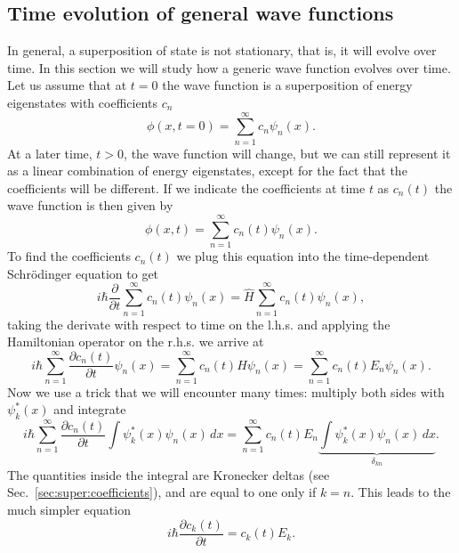 \documentclass[../Main/chem331-notes.tex]{subfiles}
\begin{document}
\subsection{Time evolution of general wave functions}
In general, a superposition of state is not stationary, that is, it will evolve over time.
In this section we will study how a generic wave function evolves over time.
Let us assume that at $t = 0$ the wave function is a superposition of energy eigenstates with coefficients $c_n$
\begin{equation}
\phi(x, t = 0) = \sum_{n = 1}^\infty c_n \psi_n(x).
\end{equation}
At a later time, $t > 0$, the wave function will change, but we can still represent it as a linear combination of energy eigenstates, except for the fact that the coefficients will be different. If we indicate the coefficients at time $t$ as $c_n(t)$ the wave function is then given by
\begin{equation}
\label{eq:super:tdwavefunction}
\phi(x, t) = \sum_{n = 1}^\infty c_n(t) \psi_n(x).
\end{equation}
To find the coefficients $c_n(t)$ we plug this equation into the time-dependent Schr\"{o}dinger equation to get
\begin{equation}
i\hbar \frac{\partial }{\partial t} \sum_{n = 1}^\infty c_n(t) \psi_n(x)= \hat{H} \sum_{n = 1}^\infty c_n(t) \psi_n(x),
\end{equation}
taking the derivate with respect to time on the l.h.s. and applying the Hamiltonian operator on the r.h.s. we arrive at
\begin{equation}
i\hbar  \sum_{n = 1}^\infty \frac{\partial c_n(t)}{\partial t} \psi_n(x)= \sum_{n = 1}^\infty c_n(t)  \hat{H}\psi_n(x) = \sum_{n = 1}^\infty c_n(t)  E_n \psi_n(x).
\end{equation}
Now we use a trick that we will encounter many times: multiply both sides with $\psi^*_k(x)$ and integrate
\begin{equation}
i\hbar  \sum_{n = 1}^\infty \frac{\partial c_n(t)}{\partial t} \int \psi^*_k(x)\psi_n(x) \, dx= \sum_{n = 1}^\infty c_n(t)  E_n \underbrace{\int \psi^*_k(x)\psi_n(x)  \,  dx}_{\delta_{kn}}.
\end{equation}
The quantities inside the integral are Kronecker deltas (see Sec.~\ref{sec:super:coefficients}), and are equal to one only if $ k = n$. This leads to the much simpler equation
\begin{equation}
i\hbar  \frac{\partial c_k(t)}{\partial t} = c_k(t)  E_k.
\end{equation}
\end{document}
